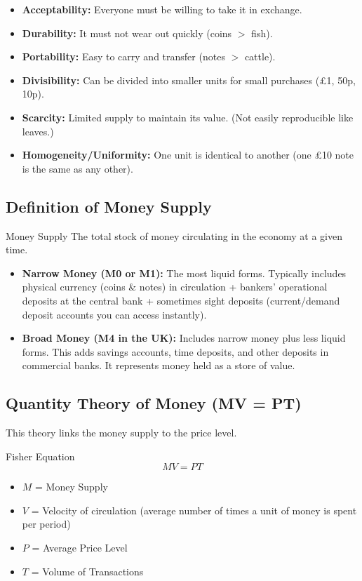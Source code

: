 \documentclass[11pt, a4paper, twoside]{book}
\begin{document}
\begin{itemize}
  \item \textbf{Acceptability:} Everyone must be willing to take it in exchange.
  \item \textbf{Durability:} It must not wear out quickly (coins $>$ fish).
  \item \textbf{Portability:} Easy to carry and transfer (notes $>$ cattle).
  \item \textbf{Divisibility:} Can be divided into smaller units for small purchases (£1, 50p, 10p).
  \item \textbf{Scarcity:} Limited supply to maintain its value. (Not easily reproducible like leaves.)
  \item \textbf{Homogeneity/Uniformity:} One unit is identical to another (one £10 note is the same as any other).
\end{itemize}

\subsection{Definition of Money Supply}

\begin{keyterm}{Money Supply}
The total stock of money circulating in the economy at a given time.
\begin{itemize}
  \item \textbf{Narrow Money (M0 or M1):} The most liquid forms. Typically includes physical currency (coins \& notes) in circulation + bankers' operational deposits at the central bank + sometimes sight deposits (current/demand deposit accounts you can access instantly).
  \item \textbf{Broad Money (M4 in the UK):} Includes narrow money plus less liquid forms. This adds savings accounts, time deposits, and other deposits in commercial banks. It represents money held as a store of value.
\end{itemize}
\end{keyterm}

\subsection{Quantity Theory of Money (MV = PT)}

This theory links the money supply to the price level.

\begin{keyterm}{Fisher Equation}
\[ MV = PT \]
\begin{itemize}
  \item $M$ = Money Supply
  \item $V$ = Velocity of circulation (average number of times a unit of money is spent per period)
  \item $P$ = Average Price Level
  \item $T$ = Volume of Transactions
\end{itemize}
\end{keyterm}
\end{document}
